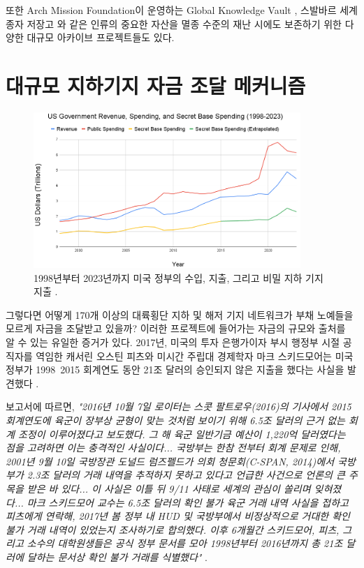 \documentclass[10pt,twocolumn,letterpaper]{article}
\begin{document}
또한 Arch Mission Foundation이 운영하는 Global Knowledge Vault \cite{29}, 스발바르 세계 종자 저장고 \cite{30}와 같은 인류의 중요한 자산을 멸종 수준의 재난 시에도 보존하기 위한 다양한 대규모 아카이브 프로젝트들도 있다.

\section{대규모 지하기지 자금 조달 메커니즘}

\begin{figure}[t]
\begin{center}
\includegraphics[width=0.9\textwidth]{govcrop2.png}
\end{center}
   \caption{1998년부터 2023년까지 미국 정부의 수입, 지출, 그리고 비밀 지하 기지 지출 \cite{19}.}
   \label{fig:9}
\end{figure}

그렇다면 어떻게 170개 이상의 대륙횡단 지하 및 해저 기지 네트워크가 부채 노예들을 모르게 자금을 조달받고 있을까? 이러한 프로젝트에 들어가는 자금의 규모와 출처를 알 수 있는 유일한 증거가 있다. 2017년, 미국의 투자 은행가이자 부시 행정부 시절 공직자를 역임한 캐서린 오스틴 피츠와 미시간 주립대 경제학자 마크 스키드모어는 미국 정부가 1998~2015 회계연도 동안 21조 달러의 승인되지 않은 지출을 했다는 사실을 발견했다 \cite{11,12,13}.

보고서에 따르면, \textit{"2016년 10월 7일 로이터는 스콧 팔트로우(2016)의 기사에서 2015 회계연도에 육군이 장부상 균형이 맞는 것처럼 보이기 위해 6.5조 달러의 근거 없는 회계 조정이 이루어졌다고 보도했다. 그 해 육군 일반기금 예산이 1,220억 달러였다는 점을 고려하면 이는 충격적인 사실이다... 국방부는 한참 전부터 회계 문제로 인해, 2001년 9월 10일 국방장관 도널드 럼즈펠드가 의회 청문회(C-SPAN, 2014)에서 국방부가 2.3조 달러의 거래 내역을 추적하지 못하고 있다고 언급한 사건으로 언론의 큰 주목을 받은 바 있다... 이 사실은 이틀 뒤 9/11 사태로 세계의 관심이 쏠리며 잊혀졌다... 마크 스키드모어 교수는 6.5조 달러의 확인 불가 육군 거래 내역 사실을 접하고 피츠에게 연락해, 2017년 봄 정부 내 HUD 및 국방부에서 비정상적으로 거대한 확인 불가 거래 내역이 있었는지 조사하기로 합의했다. 이후 6개월간 스키드모어, 피츠, 그리고 소수의 대학원생들은 공식 정부 문서를 모아 1998년부터 2016년까지 총 21조 달러에 달하는 문서상 확인 불가 거래를 식별했다"} \cite{12}.
\end{document}

